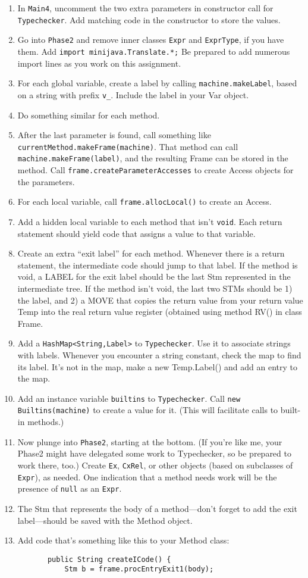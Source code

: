 \documentclass[11pt]{article}
\begin{document}
\begin{enumerate}
\item In \verb'Main4', uncomment the two extra parameters in constructor call for \verb'Typechecker'.  Add matching code in the constructor to store the values.
\item Go into \verb'Phase2' and remove inner classes \verb'Expr' and \verb'ExprType', if you have them.  Add \verb'import minijava.Translate.*;'  Be prepared to add numerous import lines as you work on this assignment.
\item For each global variable, create a label by calling \verb'machine.makeLabel', based on a string with prefix \verb'v_'.  Include the label in your Var object.
\item Do something similar for each method.
\item After the last parameter is found, call something like \verb'currentMethod.makeFrame(machine)'.  That method can call \verb'machine.makeFrame(label)', and the resulting Frame can be stored in the method.  Call \verb'frame.createParameterAccesses' to create Access objects for the parameters.
\item For each local variable, call \verb'frame.allocLocal()' to create an Access.
\item Add a hidden local variable to each method that isn't \verb'void'.  Each return statement should yield code that assigns a value to that variable.
\item Create an extra ``exit label'' for each method.  Whenever there is a return statement, the intermediate code should jump to that label.  If the method is void, a LABEL for the exit label should be the last Stm represented in the intermediate tree.  If the method isn't void, the last two STMs should be 1) the label, and 2) a MOVE that copies the return value from your return value Temp into the real return value register (obtained using method RV() in class Frame.
\item Add a \verb'HashMap<String,Label>' to \verb'Typechecker'.  Use it to associate strings with labels.  Whenever you encounter a string constant, check the map to find its label.  It's not in the map, make a new Temp.Label() and add an entry to the map.
\item Add an instance variable \verb'builtins' to \verb'Typechecker'.  Call \verb'new Builtins(machine)' to create a value for it.  (This will facilitate calls to built-in methods.)
\item Now plunge into \verb'Phase2', starting at the bottom.  (If you're like me, your Phase2 might have delegated some work to Typechecker, so be prepared to work there, too.)  Create \verb'Ex', \verb'CxRel', or other objects (based on subclasses of \verb'Expr'), as needed.  One indication that a method needs work will be the presence of \verb'null' as an \verb'Expr'.
\item The Stm that represents the body of a method---don't forget to add the exit label---should be saved with the Method object.
\item Add code that's something like this to your Method class:
\begin{verbatim}
       public String createICode() {
           Stm b = frame.procEntryExit1(body);


\end{verbatim}
\end{enumerate}
\end{document}
